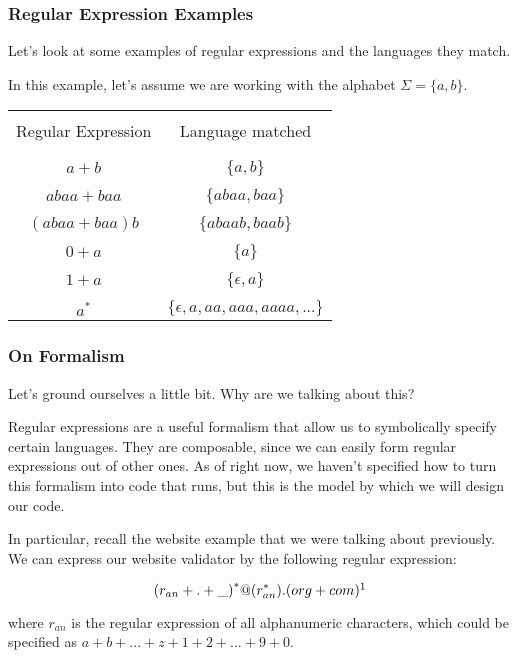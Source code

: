 \documentclass[aspectratio=169]{beamer}
\begin{document}
\begin{frame}[fragile]
  \frametitle{Regular Expression Examples}

  Let's look at some examples of regular expressions and the languages they match.

  In this example, let's assume we are working with the alphabet $\Sigma = \{a, b\}$.

  \begin{center}
    \begin{tabular}{c || c} 
      \hline & \\[-1.5ex]
      Regular Expression & Language matched \\ [2pt]
      \hline & \\[-1.5ex]
      \hline & \\[-1.5ex]
      $a + b$ & $\{a, b\}$ \\ [2pt]
      \hline & \\[-1.5ex]
      $abaa + baa$ & $\{abaa, baa\}$ \\ [2pt]
      \hline & \\[-1.5ex]
      $(abaa + baa)b$ & $\{ abaab, baab \}$ \\ [2pt]
      \hline & \\[-1.5ex]
      $0 + a$ & $\{a\}$ \\ [2pt]
      \hline & \\[-1.5ex]
      $1 + a$ & $\{ \epsilon, a \}$ \\ [2pt]
      \hline & \\[-1.5ex]
      $a^*$ & $\{ \epsilon, a, aa, aaa, aaaa, ... \}$ \\ [2pt]
      \hline
    \end{tabular}
  \end{center}
\end{frame}

\begin{frame}[fragile]
  \frametitle{On Formalism}

  Let's ground ourselves a little bit. Why are we talking about this?

  Regular expressions are a useful formalism that allow us to symbolically
  specify certain languages. They are composable, since we can easily form
  regular expressions out of other ones. As of right now, we haven't
  specified how to turn this formalism into code that runs, but this is
  the model by which we will design our code.

  In particular, recall the website example that we were talking about
  previously. We can express our website validator by the following
  regular expression:

  $${(r_{an} + . + \_ )}^* @ (r_{an}^*) . (org + com)\footnotemark$$

  where $r_{an}$ is the regular expression of all alphanumeric 
  characters, which could be specified as $a + b + ... + z + 1 + 2 + ... + 9 + 0$.

\end{frame}
\end{document}
